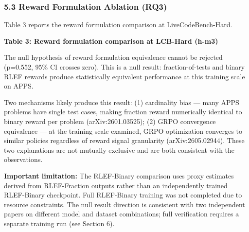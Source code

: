 \subsubsection{5.3 Reward Formulation Ablation (RQ3)}

Table 3 reports the reward formulation comparison at LiveCodeBench-Hard.

\textbf{Table 3: Reward formulation comparison at LCB-Hard (h-m3)}

\begin{table}[htbp]
\centering
{}
\end{table}

The null hypothesis of reward formulation equivalence cannot be rejected (p=0.552, 95\% CI crosses zero). This is a null result: fraction-of-tests and binary RLEF rewards produce statistically equivalent performance at this training scale on APPS.

Two mechanisms likely produce this result: (1) cardinality bias --- many APPS problems have single test cases, making fraction reward numerically identical to binary reward per problem (arXiv:2601.03525); (2) GRPO convergence equivalence --- at the training scale examined, GRPO optimization converges to similar policies regardless of reward signal granularity (arXiv:2605.02944). These two explanations are not mutually exclusive and are both consistent with the observations.

\textbf{Important limitation:} The RLEF-Binary comparison uses proxy estimates derived from RLEF-Fraction outputs rather than an independently trained RLEF-Binary checkpoint. Full RLEF-Binary training was not completed due to resource constraints. The null result direction is consistent with two independent papers on different model and dataset combinations; full verification requires a separate training run (see Section 6).

